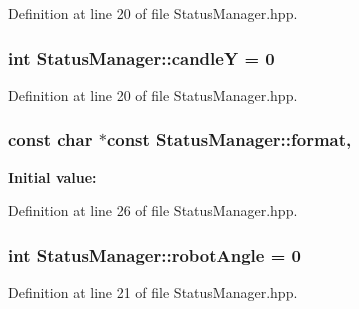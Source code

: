 Definition at line 20 of file Status\-Manager.\-hpp.

\hypertarget{classStatusManager_ac5a5ebf9f76a5ae36536be7fb2ce5383}{
\subsubsection[{candle\-Y}]{\setlength{\rightskip}{0pt plus 5cm}int Status\-Manager\-::candle\-Y = 0\hspace{0.3cm}{\ttfamily [static]}}}\label{classStatusManager_ac5a5ebf9f76a5ae36536be7fb2ce5383}


Definition at line 20 of file Status\-Manager.\-hpp.

\hypertarget{classStatusManager_a98bdd9d3e963455b576ff9a9bc5482ca}{
\subsubsection[{format}]{\setlength{\rightskip}{0pt plus 5cm}const char $\ast$const Status\-Manager\-::format\hspace{0.3cm}{\ttfamily [static]}, {\ttfamily [private]}}}\label{classStatusManager_a98bdd9d3e963455b576ff9a9bc5482ca}
{\bfseries Initial value\-:}


Definition at line 26 of file Status\-Manager.\-hpp.

\hypertarget{classStatusManager_af55087be7ac997b2db4258b26c285f1d}{
\subsubsection[{robot\-Angle}]{\setlength{\rightskip}{0pt plus 5cm}int Status\-Manager\-::robot\-Angle = 0\hspace{0.3cm}{\ttfamily [static]}}}\label{classStatusManager_af55087be7ac997b2db4258b26c285f1d}


Definition at line 21 of file Status\-Manager.\-hpp.

